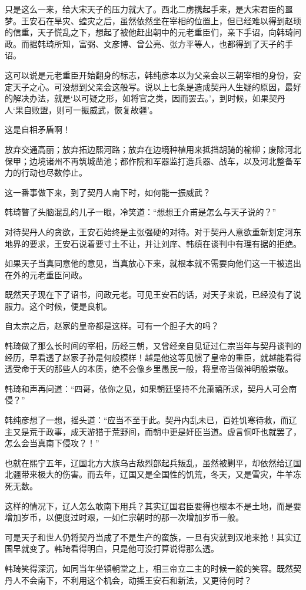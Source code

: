 只是这么一来，给大宋天子的压力就大了。西北二虏携起手来，是大宋君臣的噩梦。王安石在旱灾、蝗灾之后，虽然依然坐在宰相的位置上，但已经难以得到赵顼的信重，天子慌乱之下，想起了被他赶出朝中的元老重臣们，亲下手诏，向韩琦问政。而据韩琦所知，富弼、文彦博、曾公亮、张方平等人，也都得到了天子的手诏。

这可以说是元老重臣开始翻身的标志，韩纯彦本以为父亲会以三朝宰相的身份，安定天子之心。可没想到父亲会这般写。说以上七条是造成契丹人生疑的原因，最好的解决办法，就是‘以可疑之形，如将官之类，因而罢去。’，到时候，如果契丹人‘果自败盟，则可一振威武，恢复故疆’。

这是自相矛盾啊！

放弃交通高丽；放弃拓边熙河路；放弃在边境种植用来抵挡胡骑的榆柳；废除河北保甲；边境诸州不再筑城凿池；都作院和军器监打造兵器、战车，以及河北整备军力的行动也尽数停止。

这一番事做下来，到了契丹人南下时，如何能一振威武？

韩琦瞥了头脑混乱的儿子一眼，冷笑道：“想想王介甫是怎么与天子说的？”

对待契丹人的贪欲，王安石始终是主张强硬的对待。对于契丹人意欲重新划定河东地界的要求，王安石说着要寸土不让，并让刘庠、韩缜在谈判中有理有据的拒绝。

如果天子当真同意他的意见，当真放心下来，就根本就不需要向他们这一干被遣出在外的元老重臣问政。

既然天子现在下了诏书，问政元老。可见王安石的话，对天子来说，已经没有了说服力。这个时候，便是良机。

自太宗之后，赵家的皇帝都是这样。可有一个胆子大的吗？

韩琦做了那么长时间的宰相，历经三朝，又曾经亲自见证过仁宗当年与契丹谈判的经历，早看透了赵家子孙是何般模样！越是他这等见惯了皇帝的重臣，就越能看得透受命于天的那些人的本质，绝不会像乡里愚民一般，将皇帝当做神明般崇敬。

韩琦和声再问道：“四哥，依你之见，如果朝廷坚持不允萧禧所求，契丹人可会南侵？”

韩纯彦想了一想，摇头道：“应当不至于此。契丹内乱未已，百姓饥寒待救，而辽主又是荒于政事，成天游猎于荒野间，而朝中更是奸臣当道。虚言恫吓也就罢了，怎么会当真南下侵攻？！”

也就在熙宁五年，辽国北方大族乌古敌烈部起兵叛乱，虽然被剿平，却依然给辽国北疆带来极大的伤害。而去年，辽国又是全国性的饥荒，冬天，又是雪灾，牛羊冻死无数。

这样的情况下，辽人怎么敢南下用兵？其实辽国君臣要得也根本不是土地，而是要增加岁币，以便度过时艰，一如仁宗朝时的那一次增加岁币一般。

可是天子和世人仍将契丹当成了不是生产的蛮族，一旦有灾就到汉地来抢！其实辽国早就变了。韩琦看得明白，只是他可没打算说得那么透。

韩琦笑得深沉，如同当年坐镇朝堂之上，相三帝立二主的时候一般的笑容。既然契丹人不会南下，不利用这个机会，动摇王安石和新法，又更待何时？

